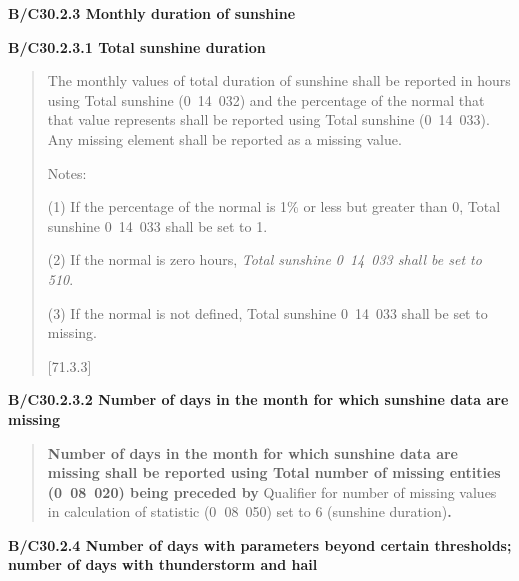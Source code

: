 \textbf{B/C30.2.3 Monthly duration of sunshine}

\textbf{B/C30.2.3.1 Total sunshine duration}

\begin{quote}
The monthly values of total duration of sunshine shall be reported in hours using Total sunshine (0~14~032) and the percentage of the normal that that value represents shall be reported using Total sunshine (0~14~033). Any missing element shall be reported as a missing value.

Notes:

(1) If the percentage of the normal is 1\% or less but greater than 0, Total sunshine 0~14~033 shall be set to 1.

(2) If the normal is zero hours, \emph{Total sunshine 0}~\emph{14}~\emph{033 shall be set to 510}.

(3) If the normal is not defined, Total sunshine 0~14~033 shall be set to missing.

{[}71.3.3{]}
\end{quote}

\textbf{B/C30.2.3.2 Number of days in the month for which sunshine data are missing}

\begin{quote}
\textbf{Number of days in the month for which sunshine data are missing shall be reported using Total number of missing entities (0~08~020) being preceded by} Qualifier for number of missing values in calculation of statistic (0\textbf{~}08~050) set to 6 (sunshine duration)\textbf{.}
\end{quote}

\textbf{B/C30.2.4 Number of days with parameters beyond certain thresholds; number of days with thunderstorm and hail}

